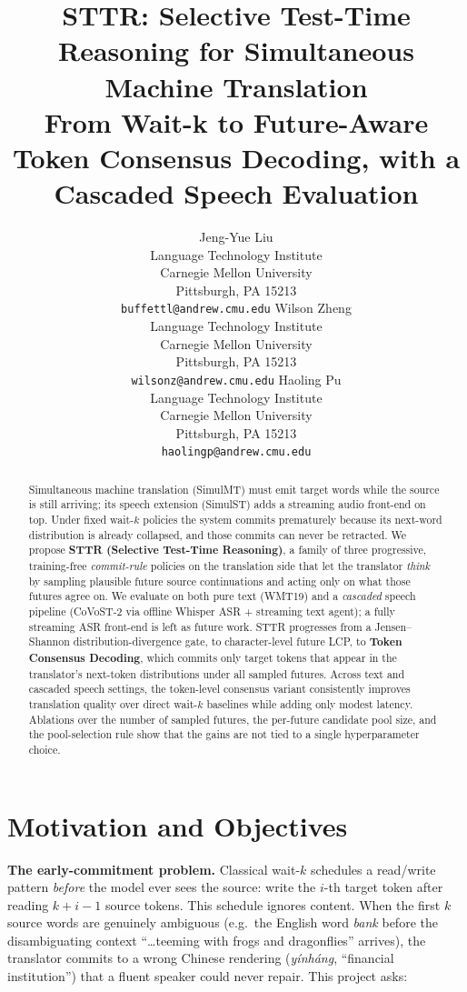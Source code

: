 \documentclass{article}
\title{STTR: Selective Test-Time Reasoning for Simultaneous Machine Translation\\
\large From Wait-k to Future-Aware Token Consensus Decoding, with a Cascaded Speech Evaluation}
\author{%
  Jeng-Yue Liu \\
  Language Technology Institute\\
  Carnegie Mellon University\\
  Pittsburgh, PA 15213\\
  \texttt{buffettl@andrew.cmu.edu}
  \And
  Wilson Zheng \\
  Language Technology Institute\\
  Carnegie Mellon University\\
  Pittsburgh, PA 15213\\
  \texttt{wilsonz@andrew.cmu.edu}
  \And
  Haoling Pu \\
  Language Technology Institute\\
  Carnegie Mellon University\\
  Pittsburgh, PA 15213\\
  \texttt{haolingp@andrew.cmu.edu}
}
\begin{document}
\maketitle

\begin{abstract}
Simultaneous machine translation (SimulMT) must emit target words while the source is still
arriving; its speech extension (SimulST) adds a streaming audio front-end on top. Under fixed
wait-$k$ policies the system commits prematurely because its next-word distribution is already
collapsed, and those commits can never be retracted. We propose \textbf{STTR (Selective
Test-Time Reasoning)}, a family of three progressive, training-free \emph{commit-rule} policies
on the translation side that let the translator \emph{think} by sampling plausible future
source continuations and acting only on what those futures agree on. We evaluate on both pure
text (WMT19) and a \emph{cascaded} speech pipeline (CoVoST-2 via offline Whisper ASR + streaming
text agent); a fully streaming ASR front-end is left as future work. STTR progresses from a
Jensen--Shannon distribution-divergence gate, to character-level future LCP, to
\textbf{Token Consensus Decoding}, which commits only target tokens that appear in the
translator's next-token distributions under all sampled futures. Across text and cascaded speech
settings, the token-level consensus variant consistently improves translation quality over
direct wait-$k$ baselines while adding only modest latency. Ablations over the number of sampled
futures, the per-future candidate pool size, and the pool-selection rule show that the gains are
not tied to a single hyperparameter choice.
\end{abstract}

\section{Motivation and Objectives}
\label{sec:motivation}

\textbf{The early-commitment problem.} Classical wait-$k$ \citep{ma2019stacl} schedules a read/write
pattern \emph{before} the model ever sees the source: write the $i$-th target token after reading
$k+i-1$ source tokens. This schedule ignores content. When the first $k$ source words are
genuinely ambiguous (e.g.\ the English word \emph{bank} before the disambiguating context
``\ldots teeming with frogs and dragonflies'' arrives), the translator commits to a wrong
Chinese rendering (\emph{y\'inh\'ang}, ``financial institution'') that a fluent
speaker could never repair. This project asks:
\end{document}
